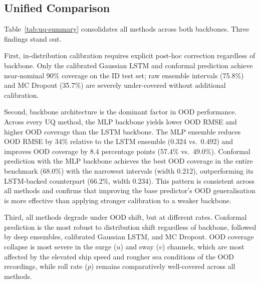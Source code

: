\documentclass[a4paper,fleqn]{cas-sc}
\begin{document}
\subsection{Unified Comparison}

Table~\ref{tab:uq-summary} consolidates all methods across both backbones. Three findings stand out.

First, in-distribution calibration requires explicit post-hoc correction regardless of backbone. Only the calibrated Gaussian LSTM and conformal prediction achieve near-nominal 90\% coverage on the ID test set; raw ensemble intervals (75.8\%) and MC Dropout (35.7\%) are severely under-covered without additional calibration.

Second, backbone architecture is the dominant factor in OOD performance. Across every UQ method, the MLP backbone yields lower OOD RMSE and higher OOD coverage than the LSTM backbone. The MLP ensemble reduces OOD RMSE by 34\% relative to the LSTM ensemble (0.324 vs.\ 0.492) and improves OOD coverage by 8.4 percentage points (57.4\% vs.\ 49.0\%). Conformal prediction with the MLP backbone achieves the best OOD coverage in the entire benchmark (68.0\%) with the narrowest intervals (width 0.212), outperforming its LSTM-backed counterpart (66.2\%, width 0.234). This pattern is consistent across all methods and confirms that improving the base predictor's OOD generalisation is more effective than applying stronger calibration to a weaker backbone.

Third, all methods degrade under OOD shift, but at different rates. Conformal prediction is the most robust to distribution shift regardless of backbone, followed by deep ensembles, calibrated Gaussian LSTM, and MC Dropout. OOD coverage collapse is most severe in the surge ($u$) and sway ($v$) channels, which are most affected by the elevated ship speed and rougher sea conditions of the OOD recordings, while roll rate ($p$) remains comparatively well-covered across all methods.
\end{document}
